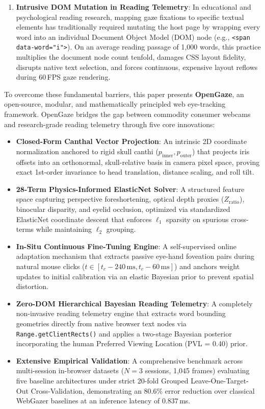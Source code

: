 \documentclass[10pt,twocolumn]{article}
\begin{document}
\begin{enumerate}[leftmargin=*]
    \item \textbf{Intrusive DOM Mutation in Reading Telemetry}: In educational and psychological reading research, mapping gaze fixations to specific textual elements has traditionally required mutating the host page by wrapping every word into an individual Document Object Model (DOM) node (e.g., \texttt{<span data-word="i">}). On an average reading passage of 1,000 words, this practice multiplies the document node count tenfold, damages CSS layout fidelity, disrupts native text selection, and forces continuous, expensive layout reflows during 60\,FPS gaze rendering.
\end{enumerate}

To overcome these fundamental barriers, this paper presents \textbf{OpenGaze}, an open-source, modular, and mathematically principled web eye-tracking framework. OpenGaze bridges the gap between commodity consumer webcams and research-grade reading telemetry through five core innovations:

\begin{itemize}[leftmargin=*]
    \item \textbf{Closed-Form Canthal Vector Projection}: An intrinsic 2D coordinate normalization anchored to rigid skull canthi ($p_{\text{inner}}, p_{\text{outer}}$) that projects iris offsets into an orthonormal, skull-relative basis in camera pixel space, proving exact 1st-order invariance to head translation, distance scaling, and roll tilt.
    \item \textbf{28-Term Physics-Informed ElasticNet Solver}: A structured feature space capturing perspective foreshortening, optical depth proxies ($Z_{\text{ratio}}$), binocular disparity, and eyelid occlusion, optimized via standardized ElasticNet coordinate descent that enforces $\ell_1$ sparsity on spurious cross-terms while maintaining $\ell_2$ grouping.
    \item \textbf{In-Situ Continuous Fine-Tuning Engine}: A self-supervised online adaptation mechanism that extracts passive eye-hand foveation pairs during natural mouse clicks ($t \in [t_c - 240\,\text{ms}, t_c - 60\,\text{ms}]$) and anchors weight updates to initial calibration via an elastic Bayesian prior to prevent spatial distortion.
    \item \textbf{Zero-DOM Hierarchical Bayesian Reading Telemetry}: A completely non-invasive reading telemetry engine that extracts word bounding geometries directly from native browser text nodes via \texttt{Range.getClientRects()} and applies a two-stage Bayesian posterior incorporating the human Preferred Viewing Location (PVL = 0.40) prior.
    \item \textbf{Extensive Empirical Validation}: A comprehensive benchmark across multi-session in-browser datasets ($N=3$ sessions, 1,045 frames) evaluating five baseline architectures under strict 20-fold Grouped Leave-One-Target-Out Cross-Validation, demonstrating an 80.6\% error reduction over classical WebGazer baselines at an inference latency of $0.837\,$ms.
\end{itemize}
\end{document}
